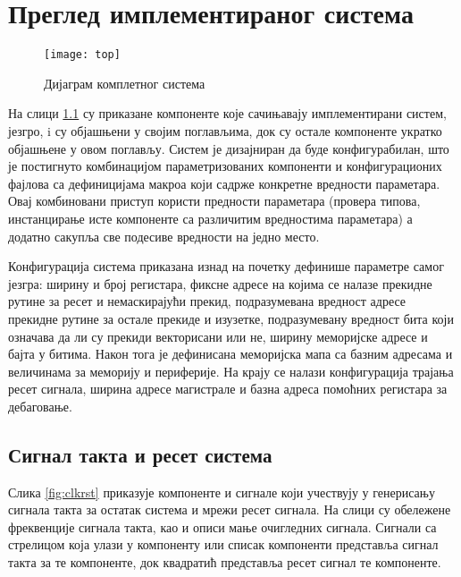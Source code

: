 \chapter{Преглед имплементираног система}

\begin{figure}[h!]
	\centering
	\texttt{[image: top]}
	\caption{Дијаграм комплетног система}
	\label{fig:top}
\end{figure}

На слици \ref{fig:top} су приказане компоненте које сачињавају имплементирани систем,  језгро,  i  су објашњени у својим поглављима, док су остале компоненте укратко објашњене у овом поглављу. Систем је дизајниран да буде конфигурабилан, што је постигнуто комбинацијом параметризованих компоненти и конфигурационих фајлова са дефиницијама макроа који садрже конкретне вредности параметара. Овај комбиновани приступ користи предности параметара (провера типова, инстанцирање исте компоненте са различитим вредностима параметара) а додатно сакупља све подесиве вредности на једно место. 



Конфигурација система приказана изнад на почетку дефинише параметре самог језгра: ширину и број регистара, фиксне адресе на којима се налазе прекидне рутине за ресет и немаскирајући прекид, подразумевана вредност адресе прекидне рутине за остале прекиде и изузетке, подразумевану вредност бита који означава да ли су прекиди векторисани или не, ширину меморијске адресе и бајта у битима. Након тога је дефинисана меморијска мапа са базним адресама и величинама за меморију и периферије. На крају се налази конфигурација трајања ресет сигнала, ширина адресе  магистрале и базна адреса помоћних регистара за дебаговање.

\section{Сигнал такта и ресет система}

Слика \ref{fig:clkrst} приказује компоненте и сигнале који учествују у генерисању сигнала такта за остатак система и мрежи ресет сигнала. На слици су обележене фреквенције сигнала такта, као и описи мање очигледних сигнала. Сигнали са стрелицом која улази у компоненту или списак компоненти представља сигнал такта за те компоненте, док квадратић представља ресет сигнал те компоненте. 


